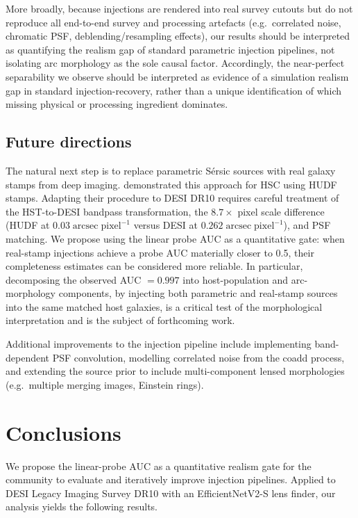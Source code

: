 \documentclass[fleqn,usenatbib]{rasti}
\begin{document}
More broadly, because injections are rendered into real survey cutouts but do not reproduce all end-to-end survey and processing artefacts (e.g.\ correlated noise, chromatic PSF, deblending/resampling effects), our results should be interpreted as quantifying the realism gap of standard parametric injection pipelines, not isolating arc morphology as the sole causal factor.  Accordingly, the near-perfect separability we observe should be interpreted as evidence of a simulation realism gap in standard injection-recovery, rather than a unique identification of which missing physical or processing ingredient dominates.


\subsection{Future directions}

The natural next step is to replace parametric S\'{e}rsic sources with real galaxy stamps from deep imaging.  \citet{Canameras2024} demonstrated this approach for HSC using HUDF stamps.  Adapting their procedure to DESI DR10 requires careful treatment of the HST-to-DESI bandpass transformation, the $8.7\times$ pixel scale difference (HUDF at $0.03\;\mathrm{arcsec\;pixel^{-1}}$ versus DESI at $0.262\;\mathrm{arcsec\;pixel^{-1}}$), and PSF matching.  We propose using the linear probe AUC as a quantitative gate: when real-stamp injections achieve a probe AUC materially closer to 0.5, their completeness estimates can be considered more reliable.  In particular, decomposing the observed AUC $= 0.997$ into host-population and arc-morphology components, by injecting both parametric and real-stamp sources into the same matched host galaxies, is a critical test of the morphological interpretation and is the subject of forthcoming work.

Additional improvements to the injection pipeline include implementing band-dependent PSF convolution, modelling correlated noise from the coadd process, and extending the source prior to include multi-component lensed morphologies (e.g.\ multiple merging images, Einstein rings).


\section{Conclusions}

We propose the linear-probe AUC as a quantitative realism gate for the community to evaluate and iteratively improve injection pipelines.  Applied to DESI Legacy Imaging Survey DR10 with an EfficientNetV2-S lens finder, our analysis yields the following results.
\end{document}
